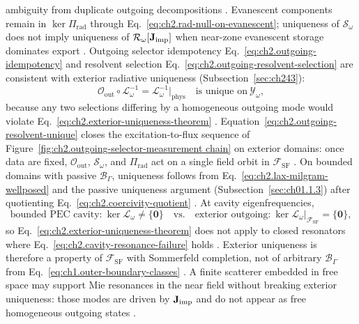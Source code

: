 ambiguity from duplicate outgoing decompositions \cite{harrington2001}. Evanescent
components remain in \(\ker\Pi_{\mathrm{rad}}\) through
Eq.~\eqref{eq:ch2.rad-null-on-evanescent}; uniqueness of \(\mathcal{S}_\omega\) does
not imply uniqueness of \(\mathcal{R}_\omega[\mathbf{J}_{\mathrm{imp}}]\) when near-zone evanescent
storage dominates export \cite{stratton1941}.
Outgoing selector idempotency Eq.~\eqref{eq:ch2.outgoing-idempotency} and resolvent
selection Eq.~\eqref{eq:ch2.outgoing-resolvent-selection} are consistent with
exterior radiative uniqueness (Subsection~\ref{sec:ch243}):
\begin{equation}
\label{eq:ch2.outgoing-resolvent-unique}
\mathcal{O}_{\mathrm{out}}\circ\mathcal{L}_\omega^{-1}
=
\mathcal{L}_\omega^{-1}\big|_{\mathrm{phys}}
\quad\text{is unique on}\ \mathcal{Y}_\omega,
\end{equation}
because any two selections differing by a homogeneous outgoing mode would violate
Eq.~\eqref{eq:ch2.exterior-uniqueness-theorem} \cite{stratton1941}.
Equation~\eqref{eq:ch2.outgoing-resolvent-unique} closes the excitation-to-flux sequence of
Figure~\ref{fig:ch2.outgoing-selector-measurement chain} on exterior domains: once data are
fixed, \(\mathcal{O}_{\mathrm{out}}\), \(\mathcal{S}_\omega\), and
\(\Pi_{\mathrm{rad}}\) act on a single field orbit in \(\mathcal{F}_{\mathrm{SF}}\)
\cite{stratton1941}.
On bounded domains with passive \(\mathcal{B}_\Gamma\), uniqueness follows from
Eq.~\eqref{eq:ch2.lax-milgram-wellposed} and
the passive uniqueness argument (Subsection~\ref{sec:ch01.1.3}) after quotienting
Eq.~\eqref{eq:ch2.coercivity-quotient} \cite{stratton1941}. At cavity eigenfrequencies,
\begin{equation}
\label{eq:ch2.exterior-vs-cavity-uniqueness}
\text{bounded PEC cavity:}\ \ker\mathcal{L}_\omega\neq\{\mathbf{0}\}
\quad\text{vs.}\quad
\text{exterior outgoing:}\ \ker\mathcal{L}_\omega|_{\mathcal{F}_{\mathrm{SF}}}=\{\mathbf{0}\},
\end{equation}
so Eq.~\eqref{eq:ch2.exterior-uniqueness-theorem} does not apply to closed resonators
where Eq.~\eqref{eq:ch2.cavity-resonance-failure} holds \cite{harrington2001}.
Exterior uniqueness is therefore a property of \(\mathcal{F}_{\mathrm{SF}}\) with
Sommerfeld completion, not of arbitrary \(\mathcal{B}_\Gamma\) from
Eq.~\eqref{eq:ch1.outer-boundary-classes} \cite{stratton1941}. A finite scatterer
embedded in free space may support Mie resonances in the near field without breaking
exterior uniqueness: those modes are driven by \(\mathbf{J}_{\mathrm{imp}}\) and do not appear as free
homogeneous outgoing states \cite{jackson1999}.
